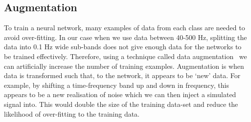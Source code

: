 %
\begin{table}
	\caption[Parameters used for simulations of \gls{CW} signals.]{\label{machine:data:injections:table} Table shows the upper and lower limits
		over which each signal parameter was randomized. The parameters $\alpha,\sin{\left(\delta \right)},f,\;\log{\left( \dot{f} \right)},\; \cos{\left(\iota
			\right)},\; \phi_0,\; \psi$ were sampled
		uniformly in the ranges specified in the table. The frequencies $f_{\rm l}$ and $f_{\rm u}$
		refer to the lower and upper frequency of the band that each signal is injected
		into. Excluding the distribution of frequencies $f$, all the injections parameters are sampled from the same distributions as the S6
		\gls{MDC}~\cite{walsh2016ComparisonMethods}.}
\end{table}

\subsection{\label{machine:data:augmentation} Augmentation}

%
To train a neural network, many examples of data from each class are needed to avoid over-fitting.
In our case when we use data between 40-500 Hz, splitting the data into 0.1 Hz wide sub-bands does not give enough data for the
networks to be trained effectively. Therefore, using a technique called data
augmentation~\cite{patrice1991TangentProp,baird1992DocumentImage} we can
artificially increase the number of training examples.
Augmentation is when data is transformed such that, to the network, it appears to be `new'
data. 
For example, by shifting a time-frequency band up and down in frequency, this appears to be a new realisation of noise which we can then inject a simulated signal into.
This would double the size of the training data-set and reduce the likelihood of over-fitting to the training data. 

